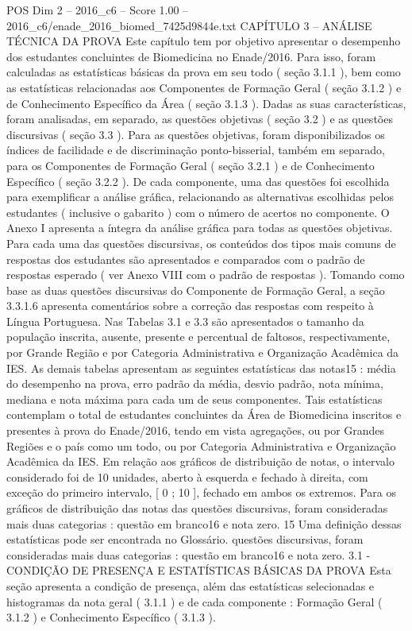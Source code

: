 \begin{textsample}{POS Dim 2 – 2016\_c6 – Score 1.00 – 2016\_c6/enade\_2016\_biomed\_7425d9844e.txt}  \label{ex:f2_pos_206}
CAPÍTULO 3 – ANÁLISE TÉCNICA DA PROVA Este capítulo tem por objetivo apresentar o desempenho dos estudantes concluintes de Biomedicina no Enade/2016.
Para isso, foram calculadas as estatísticas básicas da prova em seu todo ( seção 3.1.1 ), bem como as estatísticas relacionadas aos Componentes de Formação Geral ( seção 3.1.2 ) e de Conhecimento Específico da Área ( seção 3.1.3 ).
Dadas as suas características, foram analisadas, em separado, as questões objetivas ( seção 3.2 ) e as questões discursivas ( seção 3.3 ).
Para as questões objetivas, foram disponibilizados os índices de facilidade e de discriminação ponto-bisserial, também em separado, para os Componentes de Formação Geral ( seção 3.2.1 ) e de Conhecimento Específico ( seção 3.2.2 ).
De cada componente, uma das questões foi escolhida para exemplificar a análise gráfica, relacionando as alternativas escolhidas pelos estudantes ( inclusive o gabarito ) com o número de acertos no componente.
O Anexo I apresenta a íntegra da análise gráfica para todas as questões objetivas.
Para cada uma das questões discursivas, os conteúdos dos tipos mais comuns de respostas dos estudantes são apresentados e comparados com o padrão de respostas esperado ( ver Anexo VIII com o padrão de respostas ).
Tomando como base as duas questões discursivas do Componente de Formação Geral, a seção 3.3.1.6 apresenta comentários sobre a correção das respostas com respeito à Língua Portuguesa.
Nas Tabelas 3.1 e 3.3 são apresentados o tamanho da população inscrita, ausente, presente e percentual de faltosos, respectivamente, por Grande Região e por Categoria Administrativa e Organização Acadêmica da IES.
As demais tabelas apresentam as seguintes estatísticas das notas15 : média do desempenho na prova, erro padrão da média, desvio padrão, nota mínima, mediana e nota máxima para cada um de seus componentes.
Tais estatísticas contemplam o total de estudantes concluintes da Área de Biomedicina inscritos e presentes à prova do Enade/2016, tendo em vista agregações, ou por Grandes Regiões e o país como um todo, ou por Categoria Administrativa e Organização Acadêmica da IES.
Em relação aos gráficos de distribuição de notas, o intervalo considerado foi de 10 unidades, aberto à esquerda e fechado à direita, com exceção do primeiro intervalo, [ 0 ; 10 ], fechado em ambos os extremos.
Para os gráficos de distribuição das notas das questões discursivas, foram consideradas mais duas categorias : questão em branco16 e nota zero. 15 Uma definição dessas estatísticas pode ser encontrada no Glossário. questões discursivas, foram consideradas mais duas categorias : questão em branco16 e nota zero. 3.1 - CONDIÇÃO DE PRESENÇA E ESTATÍSTICAS BÁSICAS DA PROVA Esta seção apresenta a condição de presença, além das estatísticas selecionadas e histogramas da nota geral ( 3.1.1 ) e de cada componente : Formação Geral ( 3.1.2 ) e Conhecimento Específico ( 3.1.3 ).

\end{textsample}
